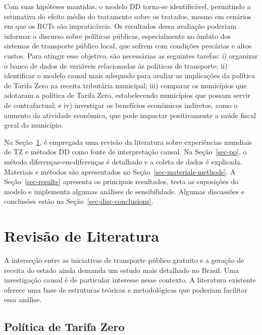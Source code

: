\documentclass[12pt, a4paper, twoside]{article}
\numberwithin{equation}{subsection} %
\begin{document}
Com suas hipóteses mantidas, o modelo DD torna-se identificável,
permitindo a estimativa do efeito médio do tratamento sobre os tratados,
mesmo em cenários em que os RCTs são impraticáveis. Os resultados dessa
avaliação poderiam informar o discurso sobre políticas públicas,
especialmente no âmbito dos sistemas de transporte público local, que
sofrem com condições precárias e altos custos. Para atingir esse
objetivo, são necessárias as seguintes tarefas: i) organizar o banco de
dados de variáveis relacionadas às políticas de transporte; ii)
identificar o modelo causal mais adequado para avaliar as implicações da
política de Tarifa Zero na receita tributária municipal; iii) comparar
os municípios que adotaram a política de Tarifa Zero, estabelecendo
municípios que possam servir de contrafactual; e iv) investigar os
benefícios econômicos indiretos, como o aumento da atividade econômica,
que pode impactar positivamente a saúde fiscal geral do município.

Na Seção~\ref{sec-literature-review}, é empregada uma revisão da
literatura sobre experiências mundiais de TZ e métodos DD como fonte de
interpretação causal. Na Seção~\ref{sec-po}, o método
diferenças-em-diferenças é detalhado e a coleta de dados é explicada.
Materiais e métodos são apresentados no
Seção~\ref{sec-materials-methods}. A Seção~\ref{sec-results} apresenta
os principais resultados, testa as suposições do modelo e implementa
algumas análises de sensibilidade. Algumas discussões e conclusões estão
na Seção~\ref{sec-disc-conclusions}.

\newpage

\hypertarget{sec-literature-review}{%
\section{Revisão de Literatura}\label{sec-literature-review}}

A interseção entre as iniciativas de transporte público gratuito e a
geração de receita do estado ainda demanda um estudo mais detalhado no
Brasil. Uma investigação causal é de particular interesse nesse
contexto. A literatura existente oferece uma base de estruturas teóricas
e metodológicas que poderiam facilitar essa análise.

\hypertarget{sec-fftp-policy}{%
\subsection{Política de Tarifa Zero}\label{sec-fftp-policy}}
\end{document}
